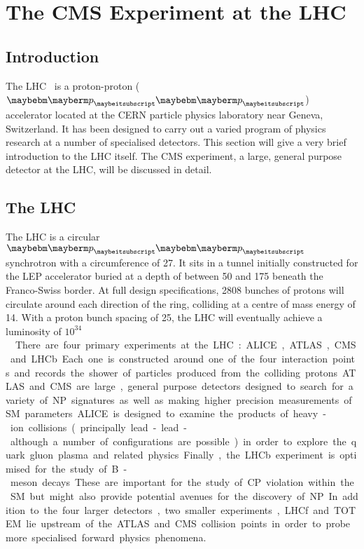 \chapter{The \acl{CMS} Experiment at the \acl{LHC}}
\label{sec:experiment}
\section{Introduction}
The \acf{LHC}~\cite{lhc_design_report} is a proton-proton ($\Pp\Pp$) accelerator
located at the CERN particle physics laboratory near Geneva, Switzerland. It has
been designed to carry out a varied program of physics research at a number of
specialised detectors. This section will give a very brief introduction to the
\ac{LHC} itself. The \acf{CMS} experiment, a large, general purpose detector at
the \ac{LHC}, will be discussed in detail.

\section{The \acl{LHC}}
The \ac{LHC} is a circular $\Pp\Pp$ synchrotron with a circumference of
\unit{27}{\kilo\metre}. It sits in a tunnel initially constructed for the
\ac{LEP} accelerator buried at a depth of between 50 and \unit{175}{\metre}
beneath the Franco-Swiss border. At full design specifications, 2808 bunches of
protons will circulate around each direction of the ring, colliding at a centre
of mass energy of \unit{14}{\TeV}. With a proton bunch spacing of
\unit{25}{\ns}, the \ac{LHC} will eventually achieve a luminosity of
\unit{$10^{34}$}{\rpsquare{\centi\metre}\usk\reciprocal\second}.

There are four primary experiments at the LHC: \ac{ALICE}, \ac{ATLAS}, \ac{CMS}
and \ac{LHCb}. Each one is constructed around one of the four interaction points
and records the shower of particles produced from the colliding protons. ATLAS
and CMS are large, general purpose detectors designed to search for a variety of
\ac{NP} signatures as well as making higher precision measurements of \ac{SM}
parameters. \ac{ALICE} is designed to examine the products of heavy-ion
collisions (principally lead-lead - although a number of configurations are
possible) in order to explore the quark gluon plasma and related
physics. Finally, the \ac{LHCb} experiment is optimised for the study of B-meson
decays. These are important for the study of CP violation within the \ac{SM} but
might also provide potential avenues for the discovery of \ac{NP}.

In addition to the four larger detectors, two smaller experiments, \ac{LHCf} and
\ac{TOTEM} lie upstream of the \ac{ATLAS} and \ac{CMS} collision points in order
to probe more specialised forward physics phenomena.

